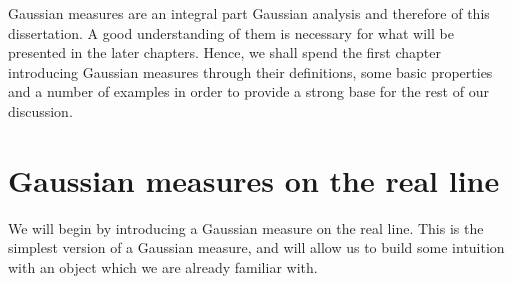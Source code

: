 \documentclass[../main.tex]{subfiles}
\begin{document}
Gaussian measures are an integral part Gaussian analysis and therefore of this dissertation. A good understanding of them is necessary for what will be presented in the later chapters. Hence, we shall spend the first chapter introducing Gaussian measures through their definitions, some basic properties and a number of examples in order to provide a strong base for the rest of our discussion.

\section{Gaussian measures on the real line}

We will begin by introducing a Gaussian measure on the real line. This is the simplest version of a Gaussian measure, and will allow us to build some intuition with an object which we are already familiar with.
\end{document}
